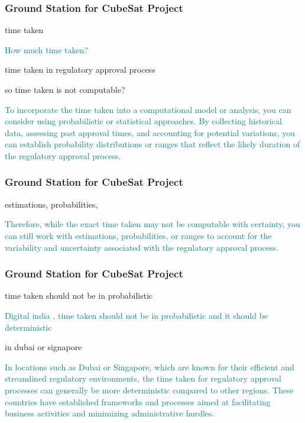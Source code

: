 \newpage
\begin{frame}
\frametitle{Ground Station for CubeSat Project }
\begin{block}{ time taken}

\textcolor{teal}{
How much  time taken?  }


time taken in  regulatory approval process

so time taken is not computable?

\textcolor{teal}{
To incorporate the time taken into a computational model or analysis, you can consider using probabilistic or statistical approaches. By collecting historical data, assessing past approval times, and accounting for potential variations, you can establish probability distributions or ranges that reflect the likely duration of the regulatory approval process.}

\end{block}
\end{frame}


\newpage
\begin{frame}
\frametitle{Ground Station for CubeSat Project }
\begin{block}{estimations, probabilities,}

\textcolor{teal}{
Therefore, while the exact time taken may not be computable with certainty, you can still work with estimations, probabilities, or ranges to account for the variability and uncertainty associated with the regulatory approval process.}


\end{block}
\end{frame}


\newpage
\begin{frame}
\frametitle{Ground Station for CubeSat Project }
\begin{block}{time taken  should not be in probabilistic}

\textcolor{teal}{
Digital india , time taken  should not be in probabilistic  and it should be deterministic  }


in dubai or signapore

\textcolor{teal}{
In locations such as Dubai or Singapore, which are known for their efficient and streamlined regulatory environments, the time taken for regulatory approval processes can generally be more deterministic compared to other regions. These countries have established frameworks and processes aimed at facilitating business activities and minimizing administrative hurdles.}


\end{block}
\end{frame}



